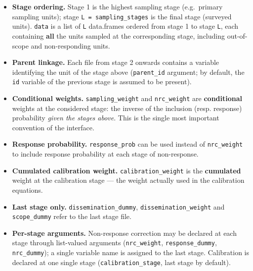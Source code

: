 \documentclass[
]{article}
\providecommand{\tightlist}{%
  \setlength{\itemsep}{0pt}\setlength{\parskip}{0pt}}
\begin{document}
\begin{itemize}
\tightlist
\item
  \textbf{Stage ordering.} Stage 1 is the highest sampling stage
  (e.g.~primary sampling units); stage \texttt{L\ =\ sampling\_stages}
  is the final stage (surveyed units). \texttt{data} is a list of
  \texttt{L} data.frames ordered from stage 1 to stage \texttt{L}, each
  containing \textbf{all} the units sampled at the corresponding stage,
  including out-of-scope and non-responding units.
\item
  \textbf{Parent linkage.} Each file from stage 2 onwards contains a
  variable identifying the unit of the stage above (\texttt{parent\_id}
  argument; by default, the \texttt{id} variable of the previous stage
  is assumed to be present).
\item
  \textbf{Conditional weights.} \texttt{sampling\_weight} and
  \texttt{nrc\_weight} are \textbf{conditional} weights at the
  considered stage: the inverse of the inclusion (resp. response)
  probability \emph{given the stages above}. This is the single most
  important convention of the interface.
\item
  \textbf{Response probability.} \texttt{response\_prob} can be used
  instead of \texttt{nrc\_weight} to include response probability at
  each stage of non-response.
\item
  \textbf{Cumulated calibration weight.} \texttt{calibration\_weight} is
  the \textbf{cumulated} weight at the calibration stage --- the weight
  actually used in the calibration equations.
\item
  \textbf{Last stage only.} \texttt{dissemination\_dummy},
  \texttt{dissemination\_weight} and \texttt{scope\_dummy} refer to the
  last stage file.
\item
  \textbf{Per-stage arguments.} Non-response correction may be declared
  at each stage through list-valued arguments (\texttt{nrc\_weight},
  \texttt{response\_dummy}, \texttt{nrc\_dummy}); a single variable name
  is assigned to the last stage. Calibration is declared at one single
  stage (\texttt{calibration\_stage}, last stage by default).
\end{itemize}
\end{document}
